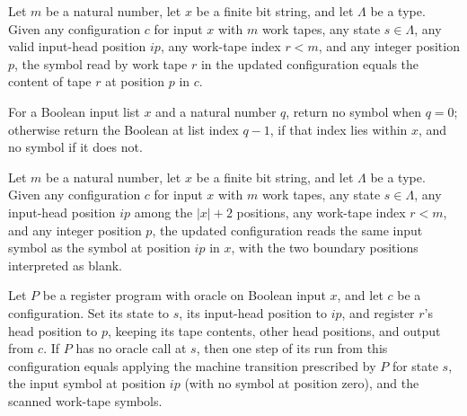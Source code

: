 \begin{lemma}
\label{Complexity.LogProg.xCfg_read}
\leanok
{}
Let $m$ be a natural number, let $x$ be a finite bit string, and let $\Lambda$ be a
type. Given any configuration $c$ for input $x$ with $m$ work tapes, any state
$s\in\Lambda$, any valid input-head position $ip$, any work-tape index $r<m$, and any
integer position $p$, the symbol read by work tape $r$ in the updated configuration
equals the content of tape $r$ at position $p$ in $c$.
\end{lemma}

\begin{definition}
\label{Complexity.LogProg.inSym}
\leanok
For a Boolean input list $x$ and a natural number $q$, return no symbol when $q=0$;
otherwise return the Boolean at list index $q-1$, if that index lies within $x$, and no
symbol if it does not.
\end{definition}

\begin{lemma}
\label{Complexity.LogProg.xCfg_inSym}
\leanok
{}
Let $m$ be a natural number, let $x$ be a finite bit string, and let $\Lambda$ be a
type. Given any configuration $c$ for input $x$ with $m$ work tapes, any state
$s\in\Lambda$, any input-head position $ip$ among the $|x|+2$ positions, any work-tape
index $r<m$, and any integer position $p$, the updated configuration reads the same
input symbol as the symbol at position $ip$ in $x$, with the two boundary positions
interpreted as blank.
\end{lemma}

\begin{lemma}
\label{Complexity.LogProg.rrun_one_x}
\leanok
{}
Let $P$ be a register program with oracle on Boolean input $x$, and let $c$ be a
configuration. Set its state to $s$, its input-head position to $ip$, and register $r$'s
head position to $p$, keeping its tape contents, other head positions, and output from
$c$. If $P$ has no oracle call at $s$, then one step of its run from this configuration
equals applying the machine transition prescribed by $P$ for state $s$, the input symbol
at position $ip$ (with no symbol at position zero), and the scanned work-tape symbols.
\end{lemma}

